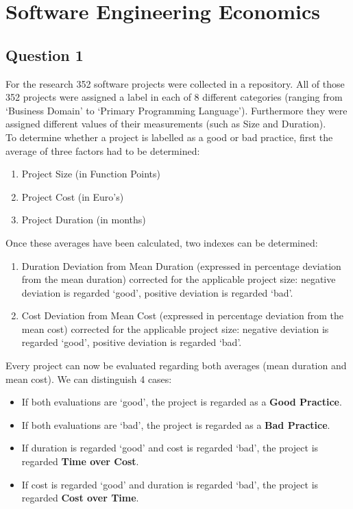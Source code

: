 \chapter{Software Engineering Economics}

\section{Question 1}

For the research 352 software projects were collected in a repository. All of those 352 projects were assigned a label in each of 8 different categories (ranging from `Business Domain' to `Primary Programming Language'). Furthermore they were assigned different values of their measurements (such as Size and Duration). \\

To determine whether a project is labelled as a good or bad practice, first the average of three factors had to be determined:

\begin{enumerate}
	\item Project Size (in Function Points)
	\item Project Cost (in Euro's)
	\item Project Duration (in months) 
\end{enumerate} 

Once these averages have been calculated, two indexes can be determined:

\begin{enumerate}
	\item Duration Deviation from Mean Duration (expressed in percentage deviation from the mean duration) corrected for the applicable project size: negative deviation is regarded `good', positive deviation is regarded `bad'. 
	\item Cost Deviation from Mean Cost (expressed in percentage deviation from the mean cost) corrected for the applicable project size: negative deviation is regarded `good', positive deviation is regarded `bad'. 
\end{enumerate}

Every project can now be evaluated regarding both averages (mean duration and mean cost). We can distinguish 4 cases:
\begin{itemize}
	\item If both evaluations are `good', the project is regarded as a \textbf{Good Practice}.
	\item If both evaluations are `bad', the project is regarded as a \textbf{Bad Practice}. 
	\item If duration is regarded `good' and cost is regarded `bad', the project is regarded \textbf{Time over Cost}.
	\item If cost is regarded `good' and duration is regarded `bad', the project is regarded \textbf{Cost over Time}.
\end{itemize}
 